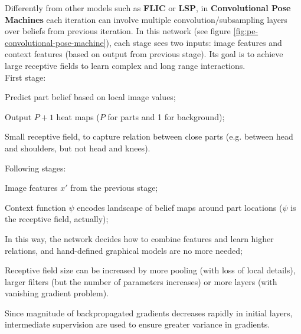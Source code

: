 Differently from other models such as \textbf{FLIC} or \textbf{LSP}, in \textbf{Convolutional Pose Machines} each iteration can involve multiple convolution/subsampling layers over beliefs from previous iteration. In this network (see figure \ref{fig:pe-convolutional-pose-machine}), each stage sees two inputs: image features and context features (based on output from previous stage). Its goal is to achieve large receptive fields to learn complex and long range interactions.\\
First stage:
\begin{myitem}
    \item Predict part belief based on local image values;
    \item Output $P+1$ heat maps ($P$ for parts and 1 for background);
    \item Small receptive field, to capture relation between close parts (e.g. between head and shoulders, but not head and knees).
\end{myitem}
Following stages:
\begin{myitem}
    \item Image features $x'$ from the previous stage;
    \item Context function $\psi$ encodes landscape of belief maps around part locations ($\psi$ is the receptive field, actually);
    \item In this way, the network decides how to combine features and learn higher relations, and hand-defined graphical models are no more needed;
    \item Receptive field size can be increased by more pooling (with loss of local details), larger filters (but the number of parameters increases) or more layers (with vanishing gradient problem).
\end{myitem}
Since magnitude of backpropagated gradients decreases rapidly in initial layers, intermediate supervision are used to ensure greater variance in gradients.


